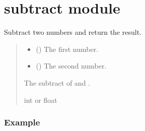 \documentclass[letterpaper,10pt,english]{sphinxmanual}
\begin{document}
\sphinxstepscope


\section{subtract module}
\label{\detokenize{subtract:module-subtract}}\label{\detokenize{subtract:subtract-module}}\label{\detokenize{subtract::doc}}

\begin{fulllineitems}
\label{\detokenize{subtract:subtract.subtract_numbers}}
\pysigstartsignatures
{}
\pysigstopsignatures
\sphinxAtStartPar
Subtract two numbers and return the result.
\begin{quote}\begin{description}
\begin{itemize}
\item {} 
\sphinxAtStartPar
{} () \sphinxhyphen{}\sphinxhyphen{} The first number.

\item {} 
\sphinxAtStartPar
{} () \sphinxhyphen{}\sphinxhyphen{} The second number.

\end{itemize}

\sphinxAtStartPar
The subtract of  and .

\sphinxAtStartPar
int or float

\end{description}\end{quote}
\subsubsection*{Example}

\begin{sphinxVerbatim}[commandchars=\\\{\}]
 
\end{sphinxVerbatim}

\end{fulllineitems}
\end{document}
